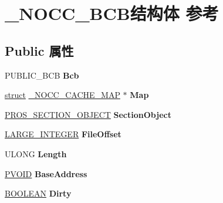\hypertarget{struct___n_o_c_c___b_c_b}{}\section{\+\_\+\+N\+O\+C\+C\+\_\+\+B\+C\+B结构体 参考}
\label{struct___n_o_c_c___b_c_b}
\subsection*{Public 属性}
\begin{DoxyCompactItemize}
\item 
\mbox{\label{struct___n_o_c_c___b_c_b_a7b76d201bb9655397c915033e6dbd2d2}} 
P\+U\+B\+L\+I\+C\+\_\+\+B\+CB {\bfseries Bcb}
\item 
\mbox{\label{struct___n_o_c_c___b_c_b_a18fa7a103dd95924b45bd452d2341f3c}} 
\hyperlink{interfacestruct}{struct} \hyperlink{struct___n_o_c_c___c_a_c_h_e___m_a_p}{\+\_\+\+N\+O\+C\+C\+\_\+\+C\+A\+C\+H\+E\+\_\+\+M\+AP} $\ast$ {\bfseries Map}
\item 
\mbox{\label{struct___n_o_c_c___b_c_b_ae417c10b441fe1a37aaf982a87fe239d}} 
\hyperlink{struct___r_o_s___s_e_c_t_i_o_n___o_b_j_e_c_t}{P\+R\+O\+S\+\_\+\+S\+E\+C\+T\+I\+O\+N\+\_\+\+O\+B\+J\+E\+CT} {\bfseries Section\+Object}
\item 
\mbox{\label{struct___n_o_c_c___b_c_b_a37ca997d932eaf6e89cab944f0e874c1}} 
\hyperlink{union___l_a_r_g_e___i_n_t_e_g_e_r}{L\+A\+R\+G\+E\+\_\+\+I\+N\+T\+E\+G\+ER} {\bfseries File\+Offset}
\item 
\mbox{\label{struct___n_o_c_c___b_c_b_a202f8f12ea5d898044f6552377df41f0}} 
U\+L\+O\+NG {\bfseries Length}
\item 
\mbox{\label{struct___n_o_c_c___b_c_b_a32bcc15007c7657fb52c1081946d0c2c}} 
\hyperlink{interfacevoid}{P\+V\+O\+ID} {\bfseries Base\+Address}
\item 
\mbox{\label{struct___n_o_c_c___b_c_b_a2f85cb39958b0bcb6475b8a930f6d503}} 
\hyperlink{_processor_bind_8h_a112e3146cb38b6ee95e64d85842e380a}{B\+O\+O\+L\+E\+AN} {\bfseries Dirty}

\end{DoxyCompactItemize}
